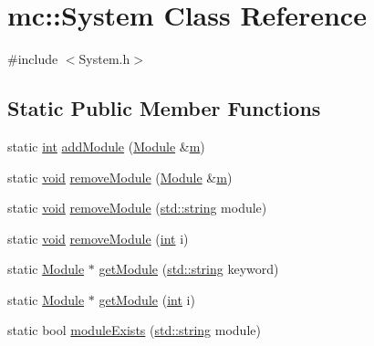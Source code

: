 \hypertarget{classmc_1_1_system}{}\section{mc\+:\+:System Class Reference}
\label{classmc_1_1_system}


{\ttfamily \#include $<$System.\+h$>$}

\subsection*{Static Public Member Functions}
\begin{DoxyCompactItemize}
\item 
static \hyperlink{_s_d_l__thread_8h_a6a64f9be4433e4de6e2f2f548cf3c08e}{int} \hyperlink{classmc_1_1_system_a21a8af9fa9f4a2699478967cbb6949ee}{add\+Module} (\hyperlink{classmc_1_1_module}{Module} \&\hyperlink{_s_d_l__opengl__glext_8h_af593500c283bf1a787a6f947f503a5c2}{m})
\item 
static \hyperlink{_s_d_l__opengles2__gl2ext_8h_ae5d8fa23ad07c48bb609509eae494c95}{void} \hyperlink{classmc_1_1_system_ab37f8cd571040772e73a07584f8b0dba}{remove\+Module} (\hyperlink{classmc_1_1_module}{Module} \&\hyperlink{_s_d_l__opengl__glext_8h_af593500c283bf1a787a6f947f503a5c2}{m})
\item 
static \hyperlink{_s_d_l__opengles2__gl2ext_8h_ae5d8fa23ad07c48bb609509eae494c95}{void} \hyperlink{classmc_1_1_system_a08969e2d1572536469827e7b44e904f9}{remove\+Module} (\hyperlink{_s_d_l__opengl__glext_8h_ae84541b4f3d8e1ea24ec0f466a8c568b}{std\+::string} module)
\item 
static \hyperlink{_s_d_l__opengles2__gl2ext_8h_ae5d8fa23ad07c48bb609509eae494c95}{void} \hyperlink{classmc_1_1_system_aed18cf4077fa7c71432197597b190508}{remove\+Module} (\hyperlink{_s_d_l__thread_8h_a6a64f9be4433e4de6e2f2f548cf3c08e}{int} i)
\item 
static \hyperlink{classmc_1_1_module}{Module} $\ast$ \hyperlink{classmc_1_1_system_afb983a07b501764541c47a773e6044c8}{get\+Module} (\hyperlink{_s_d_l__opengl__glext_8h_ae84541b4f3d8e1ea24ec0f466a8c568b}{std\+::string} keyword)
\item 
static \hyperlink{classmc_1_1_module}{Module} $\ast$ \hyperlink{classmc_1_1_system_ad5f68cf3d76b080e10684a4a82e06abd}{get\+Module} (\hyperlink{_s_d_l__thread_8h_a6a64f9be4433e4de6e2f2f548cf3c08e}{int} i)
\item 
static bool \hyperlink{classmc_1_1_system_a8d33e21ec54da4940e14e7d1eb1a522b}{module\+Exists} (\hyperlink{_s_d_l__opengl__glext_8h_ae84541b4f3d8e1ea24ec0f466a8c568b}{std\+::string} module)

\end{DoxyCompactItemize}
